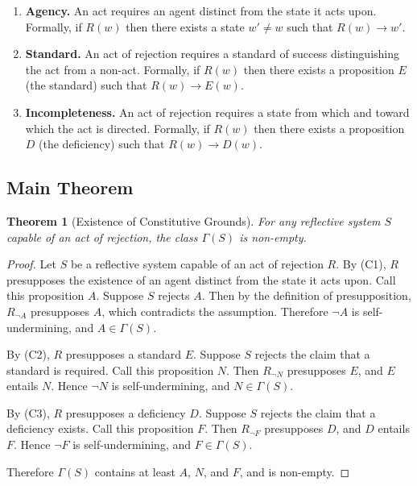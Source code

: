 \documentclass[11pt]{article}
\newtheorem{theorem}{Theorem}
\theoremstyle{remark}
\begin{document}
\begin{enumerate}[label=\textbf{(C\arabic*)}]
\item \textbf{Agency.} An act requires an agent distinct from the state it acts upon. Formally, if \(R(w)\) then there exists a state \(w' \neq w\) such that \(R(w) \to w'\).
\item \textbf{Standard.} An act of rejection requires a standard of success distinguishing the act from a non-act. Formally, if \(R(w)\) then there exists a proposition \(E\) (the standard) such that \(R(w) \to E(w)\).
\item \textbf{Incompleteness.} An act of rejection requires a state from which and toward which the act is directed. Formally, if \(R(w)\) then there exists a proposition \(D\) (the deficiency) such that \(R(w) \to D(w)\).
\end{enumerate}

\subsection{Main Theorem}

\begin{theorem}[Existence of Constitutive Grounds]
\label{thm:main}
For any reflective system \(S\) capable of an act of rejection, the class \(\Gamma(S)\) is non-empty.
\end{theorem}

\begin{proof}
Let \(S\) be a reflective system capable of an act of rejection \(R\). By (C1), \(R\) presupposes the existence of an agent distinct from the state it acts upon. Call this proposition \(A\). Suppose \(S\) rejects \(A\). Then by the definition of presupposition, \(R_{\neg A}\) presupposes \(A\), which contradicts the assumption. Therefore \(\neg A\) is self-undermining, and \(A \in \Gamma(S)\).

By (C2), \(R\) presupposes a standard \(E\). Suppose \(S\) rejects the claim that a standard is required. Call this proposition \(N\). Then \(R_{\neg N}\) presupposes \(E\), and \(E\) entails \(N\). Hence \(\neg N\) is self-undermining, and \(N \in \Gamma(S)\).

By (C3), \(R\) presupposes a deficiency \(D\). Suppose \(S\) rejects the claim that a deficiency exists. Call this proposition \(F\). Then \(R_{\neg F}\) presupposes \(D\), and \(D\) entails \(F\). Hence \(\neg F\) is self-undermining, and \(F \in \Gamma(S)\).

Therefore \(\Gamma(S)\) contains at least \(A\), \(N\), and \(F\), and is non-empty.
\end{proof}
\end{document}
